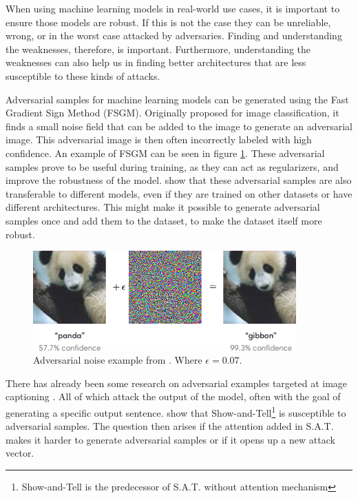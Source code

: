 When using machine learning models in real-world use cases, it is important to ensure those models are robust. If this is not the case they can be unreliable, wrong, or in the worst case attacked by adversaries. Finding and understanding the weaknesses, therefore, is important. Furthermore, understanding the weaknesses can also help us in finding better architectures that are less susceptible to these kinds of attacks.

Adversarial samples for machine learning models can be generated using the Fast Gradient Sign Method (FSGM)\cite{goodfellow2015explaining}. Originally proposed for image classification, it finds a small noise field that can be added to the image to generate an adversarial image. This adversarial image is then often incorrectly labeled with high confidence. An example of FSGM can be seen in figure \ref{adv_gibbon}. These adversarial samples prove to be useful during training, as they can act as regularizers, and improve the robustness of the model. \citeauthor{https://doi.org/10.48550/arxiv.1611.01236} show that these adversarial samples are also transferable to different models, even if they are trained on other datasets or have different architectures. This might make it possible to generate adversarial samples once and add them to the dataset, to make the dataset itself more robust.

\begin{figure}[h]
    \centering
    \includegraphics[width=0.9\textwidth]{figures/adversarial_img_1.png}
    \caption{Adversarial noise example from \protect\cite{goodfellow2015explaining}. Where $\epsilon=0.07$.}
    \label{adv_gibbon}
\end{figure}

There has already been some research on adversarial examples targeted at image captioning \cite{https://doi.org/10.48550/arxiv.2107.03050,Hongge}. All of which attack the output of the model, often with the goal of generating a specific output sentence. \citeauthor{Hongge} show that Show-and-Tell\footnote[1]{Show-and-Tell is the predecessor of S.A.T. without attention mechanism}\cite{showandtell} is susceptible to adversarial samples. The question then arises if the attention added in S.A.T. makes it harder to generate adversarial samples or if it opens up a new attack vector.


